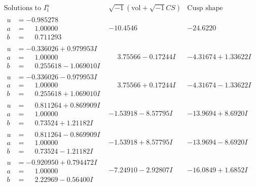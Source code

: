 \documentclass[1p]{elsarticle_modified}
\theoremstyle{definition}
\newcommand{\I}{\sqrt{-1}}
\begin{document}
$$\begin{array}{c|c|c}  
\text{Solutions to }I^u_{1}& \I (\text{vol} + \sqrt{-1}CS) & \text{Cusp shape}\\
 \hline 
\begin{aligned}
u &= -0.985278\phantom{ +0.000000I} \\
a &= \phantom{-}1.00000\phantom{ +0.000000I} \\
b &= \phantom{-}0.711293\phantom{ +0.000000I}\end{aligned}
 & -10.4546\phantom{ +0.000000I} & -24.6220\phantom{ +0.000000I} \\ \hline\begin{aligned}
u &= -0.336026 + 0.979953 I \\
a &= \phantom{-}1.00000\phantom{ +0.000000I} \\
b &= \phantom{-}0.255618 - 1.069010 I\end{aligned}
 & \phantom{-}3.75566 - 0.17244 I & -4.31674 + 1.33622 I \\ \hline\begin{aligned}
u &= -0.336026 - 0.979953 I \\
a &= \phantom{-}1.00000\phantom{ +0.000000I} \\
b &= \phantom{-}0.255618 + 1.069010 I\end{aligned}
 & \phantom{-}3.75566 + 0.17244 I & -4.31674 - 1.33622 I \\ \hline\begin{aligned}
u &= \phantom{-}0.811264 + 0.869909 I \\
a &= \phantom{-}1.00000\phantom{ +0.000000I} \\
b &= \phantom{-}0.73524 + 1.21182 I\end{aligned}
 & -1.53918 - 8.57795 I & -13.9694 + 8.6920 I \\ \hline\begin{aligned}
u &= \phantom{-}0.811264 - 0.869909 I \\
a &= \phantom{-}1.00000\phantom{ +0.000000I} \\
b &= \phantom{-}0.73524 - 1.21182 I\end{aligned}
 & -1.53918 + 8.57795 I & -13.9694 - 8.6920 I \\ \hline\begin{aligned}
u &= -0.920950 + 0.794472 I \\
a &= \phantom{-}1.00000\phantom{ +0.000000I} \\
b &= \phantom{-}2.22969 - 0.56400 I\end{aligned}
 & -7.24910 - 2.92807 I & -16.0849 + 1.6852 I \\ \hline\begin{aligned}

\end{aligned}
\end{array}$$
\end{document}
